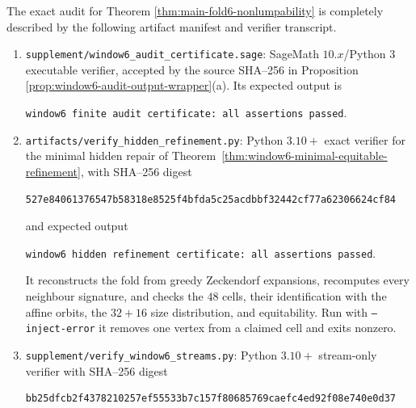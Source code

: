 \begin{proposition}\label{prop:window6-artifact-manifest-verifier-transcript}
The exact audit for Theorem \ref{thm:main-fold6-nonlumpability} is completely described by the following artifact manifest and verifier transcript.
\begin{enumerate}[label=\textup{(\alph*)}]
\item \texttt{supplement/window6\_audit\_certificate.sage}: SageMath \(10.x\)/Python \(3\) executable verifier, accepted by the source SHA--256 in Proposition \ref{prop:window6-audit-output-wrapper}\textup{(a)}.  Its expected output is
\begin{center}
\texttt{window6 finite audit certificate: all assertions passed}.
\end{center}
\item \texttt{artifacts/verify\_hidden\_refinement.py}: Python \(3.10+\) exact verifier for the
minimal hidden repair of Theorem~\ref{thm:window6-minimal-equitable-refinement}, with SHA--256
digest
\begin{center}
\begin{minipage}{0.92\linewidth}
\begin{Verbatim}[breaklines=true,breakanywhere=true,fontsize=\scriptsize]
527e84061376547b58318e8525f4bfda5c25acdbbf32442cf77a62306624cf84
\end{Verbatim}
\end{minipage}
\end{center}
and expected output
\begin{center}
\texttt{window6 hidden refinement certificate: all assertions passed}.
\end{center}
It reconstructs the fold from greedy Zeckendorf expansions, recomputes every neighbour
signature, and checks the \(48\) cells, their identification with the affine orbits, the
\(32+16\) size distribution, and equitability.  Run with \texttt{--inject-error} it removes
one vertex from a claimed cell and exits nonzero.
\item \texttt{supplement/verify\_window6\_streams.py}: Python \(3.10+\) stream-only verifier with SHA--256 digest
\begin{center}
\begin{minipage}{0.92\linewidth}
\begin{Verbatim}[breaklines=true,breakanywhere=true,fontsize=\scriptsize]
bb25dfcb2f4378210257ef55533b7c157f80685769caefc4ed92f08e740e0d37
\end{Verbatim}

\end{minipage}
\end{center}
\end{enumerate}
\end{proposition}
